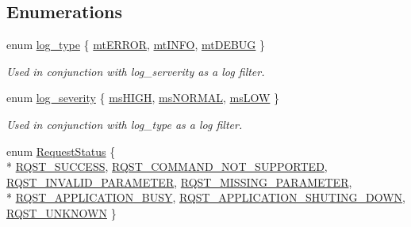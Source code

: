 \subsection*{Enumerations}
\begin{DoxyCompactItemize}
\item 
enum \hyperlink{namespacekisscpp_a18db16d1f4c281bec16e637c56b0cc88}{log\-\_\-type} \{ \hyperlink{namespacekisscpp_a18db16d1f4c281bec16e637c56b0cc88ab6a9321dc7352cd6324cb5b91c2b9ef0}{mt\-E\-R\-R\-O\-R}, 
\hyperlink{namespacekisscpp_a18db16d1f4c281bec16e637c56b0cc88a378ae6ee57c62c566ad2d616f66ee458}{mt\-I\-N\-F\-O}, 
\hyperlink{namespacekisscpp_a18db16d1f4c281bec16e637c56b0cc88a926c3f839cf24323a4b9d03ee862634c}{mt\-D\-E\-B\-U\-G}
 \}
\begin{DoxyCompactList}\small\item\em Used in conjunction with log\-\_\-serverity as a log filter. \end{DoxyCompactList}\item 
enum \hyperlink{namespacekisscpp_a2479a56cdedf21357ca5c68adc699d00}{log\-\_\-severity} \{ \hyperlink{namespacekisscpp_a2479a56cdedf21357ca5c68adc699d00a7b054f29b30a3946f37bb9d03d578b2c}{ms\-H\-I\-G\-H}, 
\hyperlink{namespacekisscpp_a2479a56cdedf21357ca5c68adc699d00a097d4becef0ba04d783713819cb5bdb7}{ms\-N\-O\-R\-M\-A\-L}, 
\hyperlink{namespacekisscpp_a2479a56cdedf21357ca5c68adc699d00af1ae3c1971eb3325095d18460ab65a7b}{ms\-L\-O\-W}
 \}
\begin{DoxyCompactList}\small\item\em Used in conjunction with log\-\_\-type as a log filter. \end{DoxyCompactList}\item 
enum \hyperlink{namespacekisscpp_af5792fb0f68695c1a1e7a4c720d9262e}{Request\-Status} \{ \\*
\hyperlink{namespacekisscpp_af5792fb0f68695c1a1e7a4c720d9262ea48f403b25d056ead863e1bb74664b388}{R\-Q\-S\-T\-\_\-\-S\-U\-C\-C\-E\-S\-S}, 
\hyperlink{namespacekisscpp_af5792fb0f68695c1a1e7a4c720d9262ead080a858803c520f16f1d575431e19ec}{R\-Q\-S\-T\-\_\-\-C\-O\-M\-M\-A\-N\-D\-\_\-\-N\-O\-T\-\_\-\-S\-U\-P\-P\-O\-R\-T\-E\-D}, 
\hyperlink{namespacekisscpp_af5792fb0f68695c1a1e7a4c720d9262ea94213a4c1e365e07fad5537b158ccd8c}{R\-Q\-S\-T\-\_\-\-I\-N\-V\-A\-L\-I\-D\-\_\-\-P\-A\-R\-A\-M\-E\-T\-E\-R}, 
\hyperlink{namespacekisscpp_af5792fb0f68695c1a1e7a4c720d9262ea3ad7cafe8fc0329ea5edde0ebf5c807e}{R\-Q\-S\-T\-\_\-\-M\-I\-S\-S\-I\-N\-G\-\_\-\-P\-A\-R\-A\-M\-E\-T\-E\-R}, 
\\*
\hyperlink{namespacekisscpp_af5792fb0f68695c1a1e7a4c720d9262eaa411a8dcb60e0303c992c74dd4df4f43}{R\-Q\-S\-T\-\_\-\-A\-P\-P\-L\-I\-C\-A\-T\-I\-O\-N\-\_\-\-B\-U\-S\-Y}, 
\hyperlink{namespacekisscpp_af5792fb0f68695c1a1e7a4c720d9262ea1e1bd5f607c7cc861e2f7173253115b4}{R\-Q\-S\-T\-\_\-\-A\-P\-P\-L\-I\-C\-A\-T\-I\-O\-N\-\_\-\-S\-H\-U\-T\-I\-N\-G\-\_\-\-D\-O\-W\-N}, 
\hyperlink{namespacekisscpp_af5792fb0f68695c1a1e7a4c720d9262ea8b54c6e47b50ce90a375d79b957f5ddb}{R\-Q\-S\-T\-\_\-\-U\-N\-K\-N\-O\-W\-N}
 \}
\end{DoxyCompactItemize}
